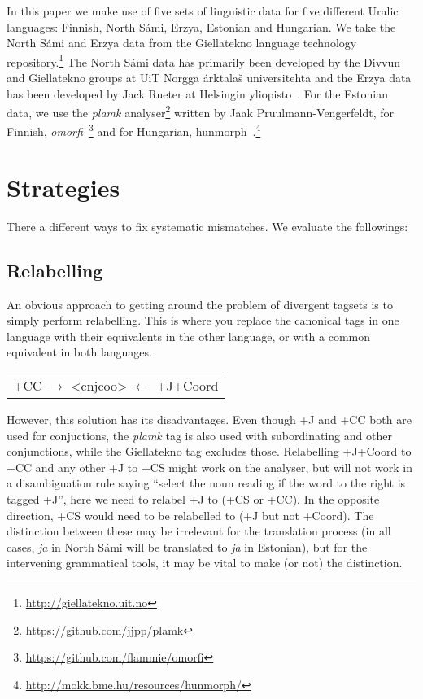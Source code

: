 \documentclass[free]{flammie}
\begin{document}
In this paper we make use of five sets of linguistic data for five different Uralic languages: Finnish, North Sámi, Erzya, Estonian and Hungarian.
We take the North Sámi and Erzya data from the Giellatekno language technology repository.\footnote{\url{http://giellatekno.uit.no}}
The North Sámi data has primarily been developed by the Divvun and Giellatekno groups at UiT Norgga árktalaš universitehta and the Erzya data has been developed by Jack Rueter at Helsingin yliopisto~\cite{rueter2010adnominal}.
For the Estonian data, we use the \emph{plamk} analyser\footnote{\url{https://github.com/jjpp/plamk}} written by Jaak Pruulmann-Vengerfeldt, for Finnish, \emph{omorfi}~\cite{pirinen2015omorfi}\footnote{\url{https://github.com/flammie/omorfi}}  and for Hungarian, hunmorph~\cite{tron2005hunmorph}.\footnote{\url{http://mokk.bme.hu/resources/hunmorph/}}





\section{Strategies}

There a different ways to fix systematic mismatches.
We evaluate the followings:

\subsection{Relabelling}

An obvious approach to getting around the problem of divergent tagsets is to simply perform relabelling. This is where you replace the canonical tags in one language with their equivalents in the other language, or with a common equivalent in both languages. 

\begin{center}
\begin{tabular}{c}
+CC $\rightarrow$ \textless{}cnjcoo\textgreater{} $\leftarrow$ +J+Coord
\end{tabular}
\end{center}

However, this solution has its disadvantages. 
Even though +J and +CC both are used for conjuctions, the \emph{plamk} tag is also used with subordinating and other  conjunctions, while the Giellatekno tag excludes those. Relabelling +J+Coord to +CC and any other +J to +CS might work on the analyser, but will not work in a disambiguation rule saying ``select the noun reading if the word to the right is tagged +J'', here we need to relabel +J to (+CS or +CC). In the opposite direction, +CS would need to be relabelled to (+J but not +Coord). The distinction between these may be irrelevant for the translation process (in all cases, \emph{ja} in North Sámi will be translated to \emph{ja} in Estonian), but for the intervening grammatical tools, it may be vital to make (or not) the distinction.
\end{document}
